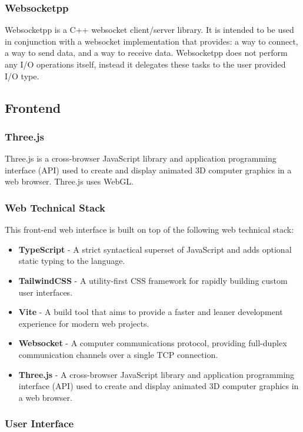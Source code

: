 \documentclass[11pt, a4paper,oneside,chapterprefix=false]{scrbook}
\begin{document}
\subsubsection{Websocketpp}
Websocketpp is a C++ websocket client/server library. It is intended to be used in conjunction with a websocket implementation that provides: a way to connect, a way to send data, and a way to receive data. Websocketpp does not perform any I/O operations itself, instead it delegates these tasks to the user provided I/O type.

\subsection{Frontend}

\subsubsection{Three.js}
Three.js is a cross-browser JavaScript library and application programming interface (API) used to create and display animated 3D computer graphics in a web browser. Three.js uses WebGL.

\subsubsection{Web Technical Stack}
This front-end web interface is built on top of the following web technical stack:
\begin{itemize}
	\item \textbf{TypeScript} - A strict syntactical superset of JavaScript and adds optional static typing to the language.
	\item \textbf{TailwindCSS} - A utility-first CSS framework for rapidly building custom user interfaces.
	\item \textbf{Vite} - A build tool that aims to provide a faster and leaner development experience for modern web projects.
	\item \textbf{Websocket} - A computer communications protocol, providing full-duplex communication channels over a single TCP connection.
	\item \textbf{Three.js} - A cross-browser JavaScript library and application programming interface (API) used to create and display animated 3D computer graphics in a web browser.
\end{itemize}

\subsubsection{User Interface}
\end{document}
